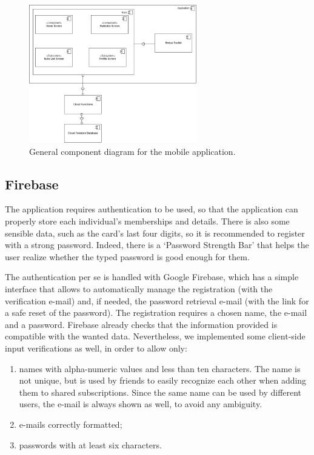 \documentclass[11pt]{article}
\begin{document}
\begin{figure}[h!]
    \begin{center}
        \includegraphics[width=0.65\textwidth, clip]{../../assets/generalComponent.drawio.png}
    \end{center}
    \caption{General component diagram for the mobile application.}
    \label{fig:componentGen}
\end{figure}

\subsection{Firebase}
The application requires authentication to be used, so that the application can properly store each individual's memberships and details. There is also some sensible data, such as the card's last four digits, so it is recommended to register with a strong password. Indeed, there is a `Password Strength Bar' that helps the user realize whether the typed password is good enough for them.

The authentication per se is handled with Google Firebase, which has a simple interface that allows to automatically manage the registration (with the verification e-mail) and, if needed, the password retrieval e-mail (with the link for a safe reset of the password). The registration requires a chosen name, the e-mail and a password. Firebase already checks that the information provided is compatible with the wanted data. Nevertheless, we implemented some client-side input verifications as well, in order to allow only:
\begin{enumerate}
    \item names with alpha-numeric values and less than ten characters. The name is not unique, but is used by friends to easily recognize each other when adding them to shared subscriptions. Since the same name can be used by different users, the e-mail is always shown as well, to avoid any ambiguity.
    \item e-mails correctly formatted;
    \item passwords with at least six characters.
\end{enumerate}
\end{document}
